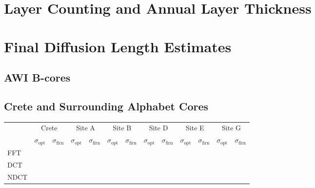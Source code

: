 \documentclass[../../CompleteThesis2/Complete_2ndDraft]{subfiles}
\begin{document}
\section[Annual Layer Thickness]{Layer Counting and Annual Layer Thickness}



\section[Diffusion Lengths]{Final Diffusion Length Estimates}

\subsection[AWI B-cores]{AWI B-cores}
\label{Sec:Results_AWIBcores}


%
%
%
%
%
%
%








\subsection[Alphabet Cores]{Crete and Surrounding Alphabet Cores}
\label{Sec:Results_AlphabetCores}

\begin{table}[ht]
	\centering
	\begin{tabular}{l||*{6}{c | c||}}
		&
		\multicolumn{2}{c}{Crete} & \multicolumn{2}{c}{Site A} & \multicolumn{2}{c}{Site B} & \multicolumn{2}{c}{Site D} & \multicolumn{2}{c}{Site E} & \multicolumn{2}{c||}{Site G} \\
		&
		$\sigma_{\text{opt}}$ & $\sigma_{\text{firn}}$ & $\sigma_{\text{opt}}$ & $\sigma_{\text{firn}}$ & $\sigma_{\text{opt}}$ & $\sigma_{\text{firn}}$ & $\sigma_{\text{opt}}$ & $\sigma_{\text{firn}}$ & $\sigma_{\text{opt}}$ & $\sigma_{\text{firn}}$ & $\sigma_{\text{opt}}$ & $\sigma_{\text{firn}}$ \\
		
		\hline
		FFT & & & & & & & & & & & & \\ 
		DCT & & & & & & & & & & & & \\ 
		NDCT & & & & & & & & & & & & \\ 
	\end{tabular}
\end{table}
\end{document}
